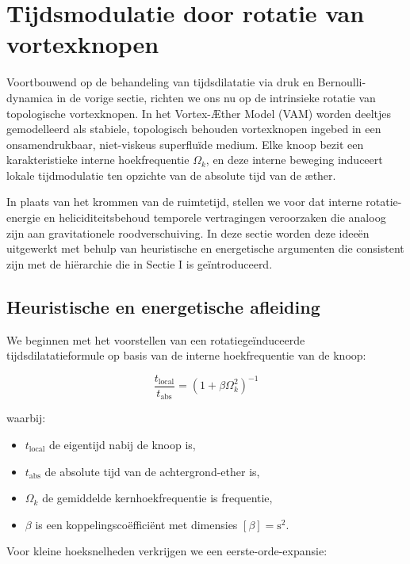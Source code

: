 \section{Tijdsmodulatie door rotatie van vortexknopen}

Voortbouwend op de behandeling van tijdsdilatatie via druk en Bernoulli-dynamica in de vorige sectie, richten we ons nu op de intrinsieke rotatie van topologische vortexknopen. In het Vortex-Æther Model (VAM) worden deeltjes gemodelleerd als stabiele, topologisch behouden vortexknopen ingebed in een onsamendrukbaar, niet-viskeus superfluïde medium. Elke knoop bezit een karakteristieke interne hoekfrequentie $\Omega_k$, en deze interne beweging induceert lokale tijdmodulatie ten opzichte van de absolute tijd van de æther.

In plaats van het krommen van de ruimtetijd, stellen we voor dat interne rotatie-energie en heliciditeitsbehoud temporele vertragingen veroorzaken die analoog zijn aan gravitationele roodverschuiving. In deze sectie worden deze ideeën uitgewerkt met behulp van heuristische en energetische argumenten die consistent zijn met de hiërarchie die in Sectie I is geïntroduceerd.

\subsection{Heuristische en energetische afleiding}

We beginnen met het voorstellen van een rotatiegeïnduceerde tijdsdilatatieformule op basis van de interne hoekfrequentie van de knoop:

\begin{equation}
\frac{t_{\text{local}}}{t_{\text{abs}}} = \left(1 + \beta \Omega_k^2 \right)^{-1}\label{eq:rotational_induced_time_dilation}
\end{equation}

waarbij:

\begin{itemize}
\item $t_{\text{local}}$ de eigentijd nabij de knoop is,
\item $t_{\text{abs}}$ de absolute tijd van de achtergrond-ether is,
\item $\Omega_k$ de gemiddelde kernhoekfrequentie is frequentie,
\item $\beta$ is een koppelingscoëfficiënt met dimensies $[\beta] = \text{s}^2$.
\end{itemize}

Voor kleine hoeksnelheden verkrijgen we een eerste-orde-expansie:

